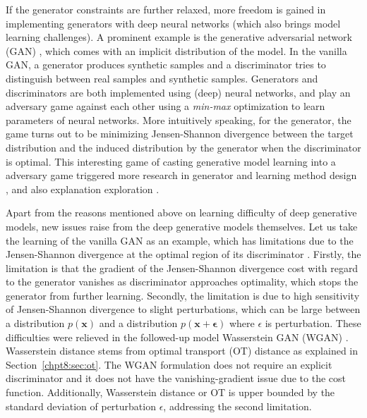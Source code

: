 If the generator constraints are further relaxed, more freedom is gained in implementing generators with deep neural networks (which also brings model learning challenges). A prominent example is the generative adversarial network (GAN) \cite{goodfellow2014gan}, which comes with an implicit distribution of the model.
In the vanilla GAN, a generator produces synthetic samples and a discriminator tries to distinguish between real samples and synthetic samples. Generators and discriminators are both implemented using (deep) neural networks, and play an adversary game against each other using a \textit{min-max} optimization to learn parameters of neural networks. More intuitively speaking, for the generator, the game turns out to be minimizing Jensen-Shannon divergence between the target distribution and the induced distribution by the generator when the discriminator is optimal.
This interesting game of casting generative model learning into a adversary game triggered more research in generator and learning method design
\cite{2015arXiv151106434R, 2015arXiv151106434R, 2018arXiv180205957M, 2018arXiv180508318Z, 2018arXiv180600880K, bang2018icml, DBLP:journals/corr/GhoshKNTD17, hoang2018mgan}, and also explanation exploration \cite{2017arXiv170104862A, 2017arXiv170107875A, 2018arXiv180607755X, 2017arXiv170104722M, NIPS2016_6399, li2018graphical}.

Apart from the reasons mentioned above on learning difficulty of deep generative models, new issues raise from the deep generative models themselves. Let us take the learning of the vanilla GAN as an example, which has limitations due to the Jensen-Shannon divergence at the optimal region of its discriminator \cite{2017arXiv170104862A}. Firstly, the limitation is that the gradient of the Jensen-Shannon divergence cost with regard to the generator vanishes as discriminator approaches optimality, which stops the generator from further learning. Secondly, the limitation is due to high sensitivity of Jensen-Shannon divergence to slight perturbations, which can be large between a distribution $p(\bm{x})$ and a distribution $p(\bm{x}+\bm{\epsilon})$ where $\epsilon$ is perturbation. These difficulties were relieved in the followed-up model Wasserstein GAN (WGAN) \cite{2017arXiv170107875A}. Wasserstein distance stems from optimal transport (OT) distance as explained in Section~\ref{chpt8:sec:ot}. The WGAN formulation does not require an explicit discriminator and it does not have the vanishing-gradient issue due to the cost function. Additionally, Wasserstein distance or OT is upper bounded by the standard deviation of perturbation $\epsilon$, addressing the second limitation.

